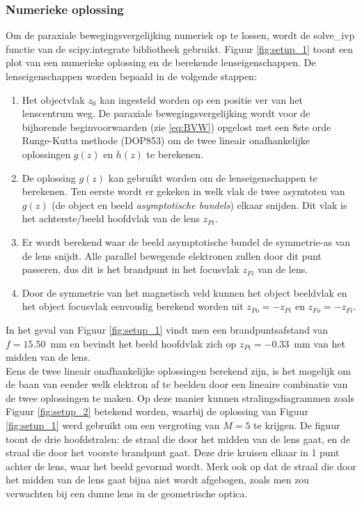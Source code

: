 \documentclass[we,twoside,openright,a4paper,11pt]{uantwerpenbamathesis}
\begin{document}
\subsubsection{Numerieke oplossing}
Om de paraxiale bewegingsvergelijking numeriek op te lossen, wordt de solve\_ivp functie van de scipy.integrate bibliotheek gebruikt. Figuur \ref{fig:setup_1} toont een plot van een numerieke oplossing en de berekende lenseigenschappen. De lenseigenschappen worden bepaald in de volgende stappen:
\begin{enumerate}
    \item Het objectvlak $z_0$ kan ingesteld worden op een positie ver van het lenscentrum weg. De paraxiale bewegingsvergelijking wordt voor de bijhorende beginvoorwaarden (zie \ref{eq:BVW}) opgelost met een 8ste orde Runge-Kutta methode (DOP853) om de twee lineair onafhankelijke oplossingen $g(z)$ en $h(z)$ te berekenen.
    \item De oplossing $g(z)$ kan gebruikt worden om de lenseigenschappen te berekenen. Ten eerste wordt er gekeken in welk vlak de twee asymtoten van $g(z)$ (de object en beeld \textit{asymptotische bundels}) elkaar snijden. Dit vlak is het achterste/beeld hoofdvlak van de lens $z_{Pi}$.
    \item Er wordt berekend waar de beeld asymptotische bundel de symmetrie-as van de lens snijdt. Alle parallel bewegende elektronen zullen door dit punt passeren, dus dit is het brandpunt in het focusvlak $z_{Fi}$ van de lens.
    \item Door de symmetrie van het magnetisch veld kunnen het object beeldvlak en het object focusvlak eenvoudig berekend worden uit $z_{Po}=-z_{Pi}$ en $z_{Fo}=-z_{Fi}$.
\end{enumerate}
In het geval van Figuur \ref{fig:setup_1} vindt men een brandpuntsafstand van $f=15.50$~mm en bevindt het beeld hoofdvlak zich op $z_{Pi}=-0.33$~mm van het midden van de lens.\\

Eens de twee lineair onafhankelijke oplossingen berekend zijn, is het mogelijk om de baan van eender welk elektron af te beelden door een lineaire combinatie van de twee oplossingen te maken. Op deze manier kunnen stralingsdiagrammen zoals Figuur \ref{fig:setup_2} betekend worden, waarbij de oplossing van Figuur \ref{fig:setup_1} werd gebruikt om een vergroting van $M=5$ te krijgen. De figuur toont de drie hoofdstralen: de straal die door het midden van de lens gaat, en de straal die door het voorste brandpunt gaat. Deze drie kruisen elkaar in 1 punt achter de lens, waar het beeld gevormd wordt. Merk ook op dat de straal die door het midden van de lens gaat bijna niet wordt afgebogen, zoals men zou verwachten bij een dunne lens in de geometrische optica.
\end{document}
